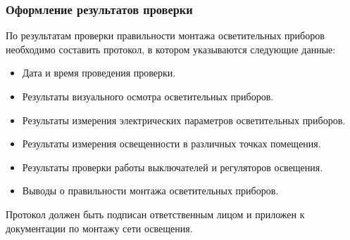 \documentclass{article}
\begin{document}
\subsubsection{Оформление результатов проверки}
По результатам проверки правильности монтажа осветительных приборов необходимо составить протокол, в котором указываются следующие данные:
\begin{itemize}
\item Дата и время проведения проверки.
\item Результаты визуального осмотра осветительных приборов.
\item Результаты измерения электрических параметров осветительных приборов.
\item Результаты измерения освещенности в различных точках помещения.
\item Результаты проверки работы выключателей и регуляторов освещения.
\item Выводы о правильности монтажа осветительных приборов.
\end{itemize}
Протокол должен быть подписан ответственным лицом и приложен к документации по монтажу сети освещения.
\end{document}
